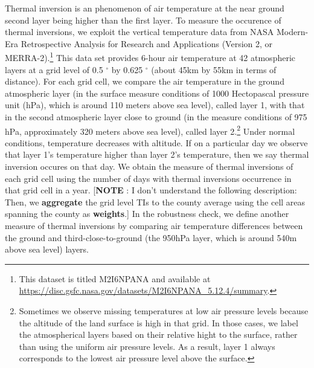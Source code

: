 \documentclass[12pt]{article}
\providecommand{\U}[1]{\protect\rule{.1in}{.1in}}
\begin{document}
\label{sec:data_TI} Thermal inversion is an phenomenon of air temperature at
the near ground second layer being higher than the first layer. To measure
the occurence of thermal inversions, we exploit the vertical temperature
data from NASA Modern-Era Retrospective Analysis for Research and
Applications (Version 2, or MERRA-2).\footnote{%
This dataset is titled M2I6NPANA and available at %
\url{https://disc.gsfc.nasa.gov/datasets/M2I6NPANA_5.12.4/summary}.} This
data set provides 6-hour air temperature at 42 atmospheric layers at a grid
level of 0.5 
${{}^\circ}$
by 0.625 
${{}^\circ}$
(about 45km by 55km in terms of distance). For each grid cell, we compare
the air temperature in the ground atmospheric layer (in the surface measure
conditions of 1000 Hectopascal pressure unit (hPa), which is around 110
meters above sea level), called layer 1, with that in the second atmospheric
layer close to ground (in the measure conditions of 975 hPa, approximately
320 meters above sea level), called layer 2.\footnote{%
Sometimes we observe missing temperatures at low air pressure levels because
the altitude of the land surface is high in that grid. In those cases, we
label the atmospherical layers based on their relative hight to the surface,
rather than using the uniform air pressure levels. As a result, layer 1
always corresponds to the lowest air pressure level above the surface.}
Under normal conditions, temperature decreases with altitude. If on a
particular day we observe that layer 1's temperature higher than layer 2's
temperature, then we say thermal inversion occures on that day. We obtain
the measure of thermal inversions of each grid cell using the number of days
with thermal inversions occurrence in that grid cell in a year. [\textbf{NOTE%
}: I don't understand the following description: Then, we \textbf{aggregate}
the grid level TIs to the county average using the cell areas spanning the
county as \textbf{weights}.] In the robustness check, we define another
measure of thermal inversions by comparing air temperature differences
between the ground and third-close-to-ground (the 950hPa layer, which is
around 540m above sea level) layers.
\end{document}
